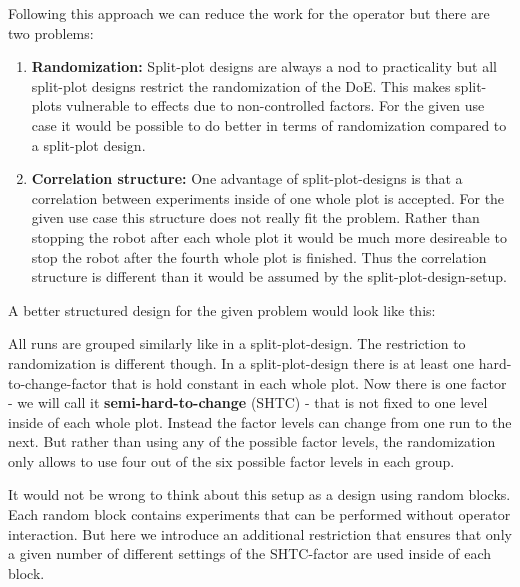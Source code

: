 Following this approach we can reduce the work for the operator but there are two problems:

\begin{enumerate}
\item \textbf{Randomization:} Split-plot designs are always a nod to practicality but all split-plot designs restrict the randomization of the DoE. This makes split-plots vulnerable to effects due to non-controlled factors. For the given use case it would be possible to do better in terms of randomization compared to a split-plot design.
\item \textbf{Correlation structure:} One advantage of split-plot-designs is that a correlation between experiments inside of one whole plot is accepted. For the given use case this structure does not really fit the problem. Rather than stopping the robot after each whole plot it would be much more desireable to stop the robot after the fourth whole plot is finished. Thus the correlation structure is different than it would be assumed by the split-plot-design-setup.
\end{enumerate}

A better structured design for the given problem would look like this:	

\begin{table}[!h]
	\caption{Semi Split Plot Design}
\end{table}

All runs are grouped similarly like in a split-plot-design. The restriction to randomization is different though. In a split-plot-design there is at least one hard-to-change-factor that is hold constant in each whole plot. Now there is one factor - we will call it \textbf{semi-hard-to-change} (SHTC) - that is not fixed to one level inside of each whole plot. Instead the factor levels can change from one run to the next. But rather than using any of the possible factor levels, the randomization only allows to use four out of the six possible factor levels in each group.

It would not be wrong to think about this setup as a design using random blocks. Each random block contains experiments that can be performed without operator interaction. But here we introduce an additional restriction that ensures that only a given number of different settings of the SHTC-factor are used inside of each block.
